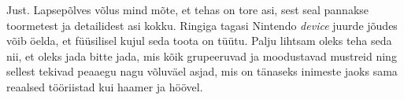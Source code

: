
Just. Lapsepõlves võlus mind mõte, et tehas on 
tore asi, sest seal pannakse toormetest ja detailidest asi kokku. Ringiga tagasi Nintendo \emph{device} 
juurde jõudes võib öelda, et füüsilisel kujul seda toota on tüütu. Palju lihtsam oleks teha 
seda nii, et oleks jada bitte jada, mis kõik grupeeruvad ja moodustavad 
mustreid ning sellest tekivad peaaegu nagu võluväel asjad, mis on
tänaseks inimeste jaoks sama reaalsed tööriistad kui haamer ja höövel.
